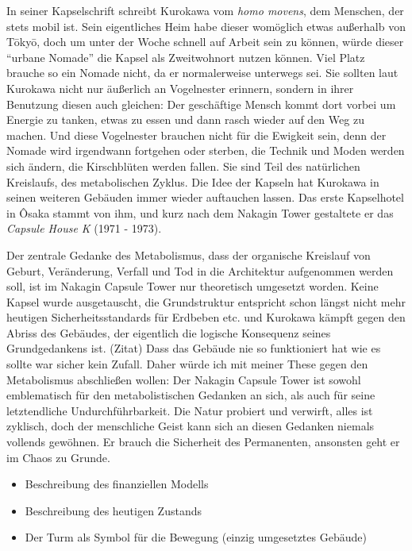 \documentclass[a4paper, 12pt]{article}
\begin{document}
\begin{onehalfspace}
In seiner Kapselschrift schreibt Kurokawa vom \emph{homo movens}, dem Menschen, der stets mobil ist. Sein eigentliches Heim habe dieser womöglich etwas außerhalb von Tōkyō, doch um unter der Woche schnell auf Arbeit sein zu können, würde dieser “urbane Nomade” die Kapsel als Zweitwohnort nutzen können. Viel Platz brauche so ein Nomade nicht, da er normalerweise unterwegs sei. Sie sollten laut Kurokawa nicht nur äußerlich an Vogelnester erinnern, sondern in ihrer Benutzung diesen auch gleichen: Der geschäftige Mensch kommt dort vorbei um Energie zu tanken, etwas zu essen und dann rasch wieder auf den Weg zu machen. Und diese Vogelnester brauchen nicht für die Ewigkeit sein, denn der Nomade wird irgendwann fortgehen oder sterben, die Technik und Moden werden sich ändern, die Kirschblüten werden fallen. Sie sind Teil des natürlichen Kreislaufs, des metabolischen Zyklus. Die Idee der Kapseln hat Kurokawa in seinen weiteren Gebäuden immer wieder auftauchen lassen. Das erste Kapselhotel in Ôsaka stammt von ihm, und kurz nach dem Nakagin Tower gestaltete er das \emph{Capsule House K} (1971 - 1973). 


Der zentrale Gedanke des Metabolismus, dass der organische Kreislauf von Geburt, Veränderung, Verfall und Tod in die Architektur aufgenommen werden soll, ist im Nakagin Capsule Tower nur theoretisch umgesetzt worden. Keine Kapsel wurde ausgetauscht, die Grundstruktur entspricht schon längst nicht mehr heutigen Sicherheitsstandards für Erdbeben etc. und Kurokawa kämpft gegen den Abriss des Gebäudes, der eigentlich die logische Konsequenz seines Grundgedankens ist. (Zitat) Dass das Gebäude nie so funktioniert hat wie es sollte war sicher kein Zufall.
Daher würde ich mit meiner These gegen den Metabolismus abschließen wollen: Der Nakagin Capsule Tower ist sowohl emblematisch für den metabolistischen Gedanken an sich, als auch für seine letztendliche Undurchführbarkeit. Die Natur probiert und verwirft, alles ist zyklisch, doch der menschliche Geist kann sich an diesen Gedanken niemals vollends gewöhnen. Er brauch die Sicherheit des Permanenten, ansonsten geht er im Chaos zu Grunde. 



\begin{itemize}
  \item Beschreibung des finanziellen Modells
  \item Beschreibung des heutigen Zustands 
  \item Der Turm als Symbol für die Bewegung (einzig umgesetztes Gebäude)
\end{itemize}



\end{onehalfspace}
\end{document}
